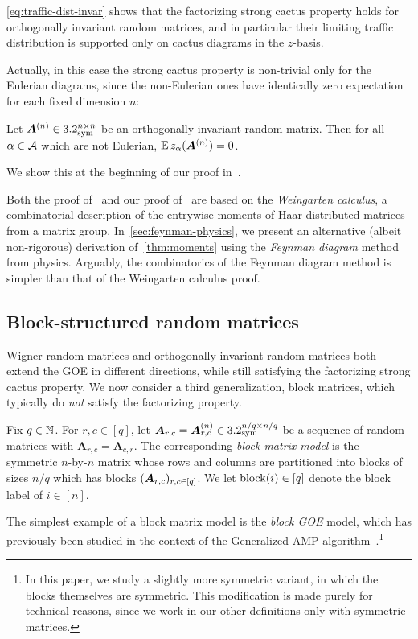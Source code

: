\cref{eq:traffic-dist-invar} shows
that the factorizing strong cactus property holds for orthogonally invariant random matrices,
and in particular their limiting traffic distribution is supported only on cactus diagrams in the $z$-basis.

Actually, in this case the strong cactus
property is non-trivial only
for the Eulerian diagrams,
since the non-Eulerian ones have identically zero expectation for each fixed dimension $n$:
\begin{claim}\label{lem:eulerian}
    Let ${\bm A}^{(n)} \in 3.2^{n \times n}_{\mathrm{sym}}$ be an orthogonally invariant random matrix.
    Then for all $\alpha \in {\cal A}$ which are not Eulerian,
    $\operatorname*{\mathbb{E}} z_\alpha({\bm A}^{(n)}) = 0$.
\end{claim}
\noindent 
We show this at the beginning of our proof in~.

Both the proof of~\cite[Theorem 1.1]{cebron2024traffic} and our proof of~ are based on the \emph{Weingarten calculus}, a combinatorial description of the entrywise moments of Haar-distributed matrices from a matrix group.
In~\cref{sec:feynman-physics}, we present an alternative (albeit non-rigorous) derivation of~\cref{thm:moments} using the {\em Feynman diagram} method from physics.
Arguably, the combinatorics of the Feynman diagram method is simpler than that of the Weingarten calculus proof.



\subsection{Block-structured random matrices}
\label{sec:wigner-block}

Wigner random matrices and orthogonally invariant random matrices both
extend the GOE in different directions, while still satisfying the
factorizing strong cactus property.
We now consider a third
generalization, block matrices, which typically do
{\em not} satisfy
the factorizing property.


Fix $q\in \mathbb{N}$. For $r,c \in [q]$, let
$\bm A_{r,c} = {\bm A}_{r,c}^{(n)} \in 3.2_{\mathrm{sym}}^{n/q \times n/q}$ be a sequence of
random matrices with $\bm A_{r,c} = \bm A_{c,r}$.
The corresponding {\em block matrix model} is the symmetric $n$-by-$n$ matrix
whose rows and columns are partitioned into
blocks of sizes $n/q$ which has blocks $({\bm A}_{r,c})_{r,c \in [q]}$.
We let $\operatorname{block}(i) \in [q]$ denote the block label of
$i \in [n]$.

The simplest example of a block matrix model is the {\em block GOE} model,
which has previously been studied in the context of the Generalized AMP algorithm~\cite{javanmard2013state}.\footnote{In this paper, we study a slightly more symmetric variant, in which the blocks themselves are symmetric. This modification is made purely for technical reasons, since we work in our other definitions only with symmetric matrices.}

